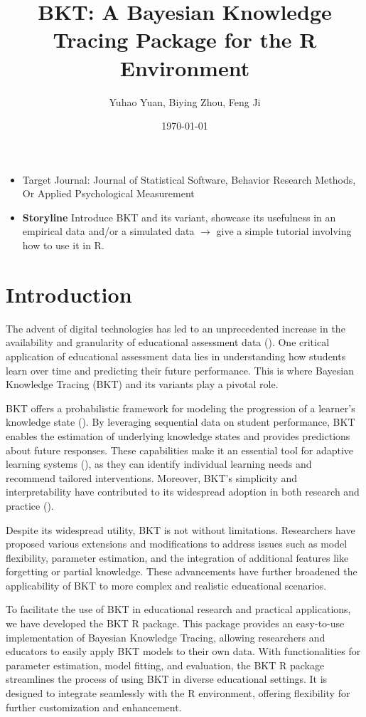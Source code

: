 \documentclass{article}
\title{BKT: A Bayesian Knowledge Tracing Package for the R Environment}
\author{Yuhao Yuan, Biying Zhou, Feng Ji}
\date{\today}
\begin{document}
\maketitle

\begin{itemize}
    \item Target Journal: Journal of Statistical Software, Behavior Research Methods, Or Applied Psychological Measurement
    \item \textbf{Storyline} Introduce BKT and its variant, showcase its usefulness in an empirical data and/or a simulated data $\rightarrow$ give a simple tutorial involving how to use it in R.
\end{itemize}
\section{Introduction}

The advent of digital technologies has led to an unprecedented increase in the availability and granularity of educational assessment data (\cite{chrysafiadi2013student}). One critical application of educational assessment data lies in understanding how students learn over time and predicting their future performance. This is where Bayesian Knowledge Tracing (BKT) and its variants play a pivotal role.

BKT offers a probabilistic framework for modeling the progression of a learner's knowledge state (\cite{corbett1994knowledge}). By leveraging sequential data on student performance, BKT enables the estimation of underlying knowledge states and provides predictions about future responses. These capabilities make it an essential tool for adaptive learning systems (\cite{nkambou2010advances}), as they can identify individual learning needs and recommend tailored interventions. Moreover, BKT's simplicity and interpretability have contributed to its widespread adoption in both research and practice (\cite{am2021literature}).

Despite its widespread utility, BKT is not without limitations. Researchers have proposed various extensions and modifications to address issues such as model flexibility, parameter estimation, and the integration of additional features like forgetting or partial knowledge. These advancements have further broadened the applicability of BKT to more complex and realistic educational scenarios.

To facilitate the use of BKT in educational research and practical applications, we have developed the BKT R package. This package provides an easy-to-use implementation of Bayesian Knowledge Tracing, allowing researchers and educators to easily apply BKT models to their own data. With functionalities for parameter estimation, model fitting, and evaluation, the BKT R package streamlines the process of using BKT in diverse educational settings. It is designed to integrate seamlessly with the R environment, offering flexibility for further customization and enhancement.
\end{document}
